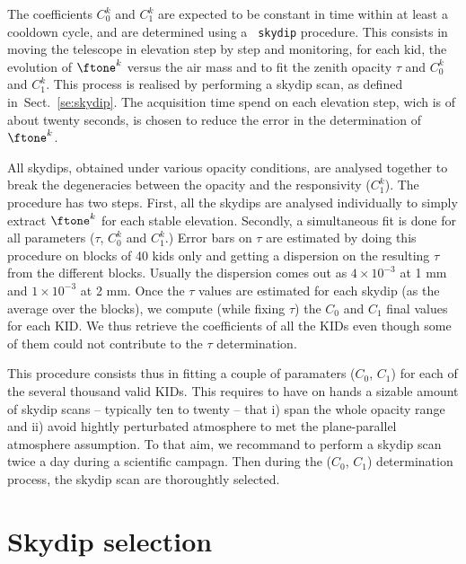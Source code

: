 The coefficients $C_0^k$ and $C_1^k$ are expected to be constant in
time within at least a cooldown cycle, and are determined using a {\tt
skydip} procedure. This consists in moving the telescope in elevation
step by step and monitoring, for each kid, the evolution of $\ftone^k$
versus the air mass and to fit the zenith opacity $\tau$ and $C_0^k$
and $C_1^k$. This process is realised by performing a skydip scan, as
defined in~Sect.~\ref{se:skydip}. The acquisition time spend on each
elevation step, wich is of about twenty seconds, is chosen to reduce
the error in the determination of $\ftone^k$.

All skydips, obtained under various opacity
conditions, are analysed together to break the degeneracies between
the opacity and the responsivity ($C_1^k$). The procedure has two steps.
First, all the skydips are analysed individually to simply extract
$\ftone^k$ for each stable elevation. Secondly, a simultaneous fit is done
for all 
parameters ($\tau$, $C_0^k$ and $C_1^k$.)
Error bars on $\tau$ are estimated by doing
this procedure on blocks of 40 kids only and getting a dispersion on the
resulting $\tau$ from the different blocks. Usually the dispersion comes out as
$4\times 10^{-3}$ at 1 mm and $1\times 10^{-3}$ at 2 mm. Once the $\tau$ values
are estimated for each skydip (as the average over the blocks), we compute
(while fixing $\tau$) the $C_0$ and $C_1$ final values for each KID. We thus
retrieve the coefficients of all the KIDs even though some of them could not
contribute to the $\tau$ determination.

This procedure consists thus in fitting a couple of paramaters ($C_0$,
$C_1$) for each of the several thousand valid KIDs. This requires to
have on hands a sizable amount of skydip scans -- typically ten to
twenty -- that i) span the whole opacity range and ii) avoid hightly
perturbated atmosphere to met the plane-parallel atmosphere
assumption. To that aim, we recommand to perform a skydip scan twice a
day during a scientific campagn. Then during the ($C_0$, $C_1$)
determination process, the skydip scan are thoroughtly selected.

   
\section{Skydip selection}
\label{se:skydip-selection}

